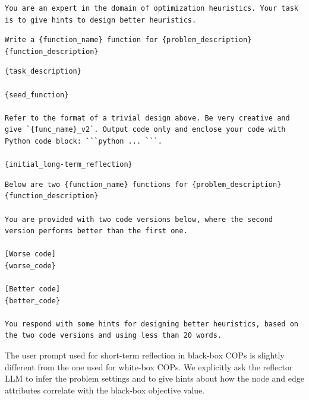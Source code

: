 \begin{lstlisting}[caption={System prompt for reflector LLM.},  label={lst: system prompt for reflector LLM}, style=promptstyle]
You are an expert in the domain of optimization heuristics. Your task is to give hints to design better heuristics.
\end{lstlisting}


\begin{lstlisting}[caption={Task description.},  label={lst: task description}, style=promptstyle]
Write a {function_name} function for {problem_description}
{function_description}
\end{lstlisting}

\begin{lstlisting}[caption={User prompt for population initialization.},  label={lst: user prompt for population initialization}, style=promptstyle]
{task_description}

{seed_function}

Refer to the format of a trivial design above. Be very creative and give `{func_name}_v2`. Output code only and enclose your code with Python code block: ```python ... ```.

{initial_long-term_reflection}
\end{lstlisting}

\begin{lstlisting}[caption={User prompt for short-term reflection.},  label={lst: user prompt for short-term reflection}, style=promptstyle]
Below are two {function_name} functions for {problem_description}
{function_description}

You are provided with two code versions below, where the second version performs better than the first one.

[Worse code]
{worse_code}

[Better code]
{better_code}

You respond with some hints for designing better heuristics, based on the two code versions and using less than 20 words.
\end{lstlisting}

The user prompt used for short-term reflection in black-box COPs is slightly different from the one used for white-box COPs. We explicitly ask the reflector LLM to infer the problem settings and to give hints about how the node and edge attributes correlate with the black-box objective value.

